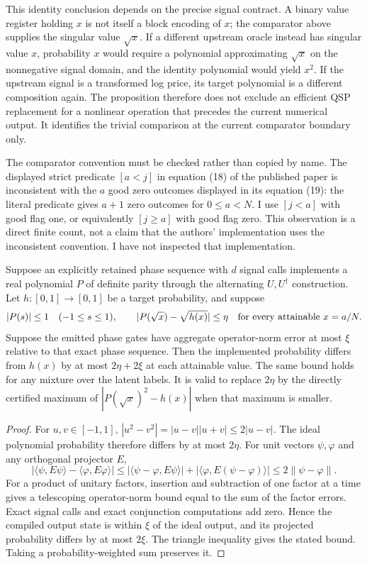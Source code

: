 This identity conclusion depends on the precise signal contract. A
binary value register holding $x$ is not itself a block encoding of $x$;
the comparator above supplies the singular value $\sqrt x$. If a
different upstream oracle instead has singular value $x$, probability
$x$ would require a polynomial approximating $\sqrt x$ on the
nonnegative signal domain, and the identity polynomial would yield
$x^2$. If the upstream signal is a transformed log price, its target
polynomial is a different composition again. The proposition therefore
does not exclude an efficient QSP replacement for a nonlinear operation
that precedes the current numerical output. It identifies the trivial
comparison at the current comparator boundary only.

The comparator convention must be checked rather than copied by name.
The displayed strict predicate $[a<j]$ in equation (18) of the published
paper is inconsistent with the $a$ good zero outcomes displayed in its
equation (19): the literal predicate gives $a+1$ zero outcomes for
$0\leq a<N$. I use $[j<a]$ with good flag one, or equivalently
$[j\geq a]$ with good flag zero. This observation is a direct finite
count, not a claim that the authors' implementation uses the inconsistent
convention. I have not inspected that implementation.

\begin{proposition}
\label{prop:qsp-transform-complete-specification}
Suppose an explicitly retained phase sequence with $d$ signal calls
implements a real polynomial $P$ of definite parity through the
alternating $U,U^\dagger$ construction. Let $h:[0,1]\to[0,1]$ be a
target probability, and suppose
\[
 |P(s)|\leq1\quad(-1\leq s\leq1),\qquad
 |P(\sqrt x)-\sqrt{h(x)}|\leq\eta
 \quad\hbox{for every attainable }x=a/N.
\]
Suppose the emitted phase gates have aggregate operator-norm error at
most $\xi$ relative to that exact phase sequence. Then the implemented
probability differs from $h(x)$ by at most $2\eta+2\xi$ at each attainable
value. The same bound holds for any mixture over the latent labels.
It is valid to replace $2\eta$ by the directly certified maximum of
$|P(\sqrt x)^2-h(x)|$ when that maximum is smaller.
\end{proposition}

\begin{proof}
For $u,v\in[-1,1]$, $|u^2-v^2|=|u-v||u+v|\leq2|u-v|$.
The ideal polynomial probability therefore differs by at most $2\eta$.
For unit vectors $\psi,\varphi$ and any orthogonal projector $E$,
\[
 |\langle\psi,E\psi\rangle-\langle\varphi,E\varphi\rangle|
 \leq |\langle\psi-\varphi,E\psi\rangle|
       +|\langle\varphi,E(\psi-\varphi)\rangle|
 \leq2\|\psi-\varphi\|.
\]
For a product of unitary factors, insertion and subtraction of one
factor at a time gives a telescoping operator-norm bound equal to the
sum of the factor errors. Exact signal calls and exact conjunction
computations add zero. Hence the compiled output state is within $\xi$
of the ideal output, and its projected probability differs by at most
$2\xi$. The triangle inequality gives the stated bound. Taking a
probability-weighted sum preserves it.
\end{proof}

